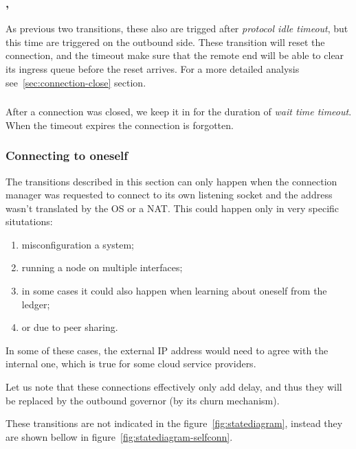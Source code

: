 \subsubsection{\CommitUniLoc{}, \CommitDupLoc{}}\label{sec:tr_commit_loc}
As previous two transitions, these also are trigged after \textit{protocol idle
timeout}, but this time are triggered on the outbound side.  These transition
will reset the connection, and the timeout make sure that the remote end will
be able to clear its ingress queue before the \TCP{} reset arrives.  For a more
detailed analysis see~\ref{sec:connection-close} section.


\subsubsection{\Terminate{}}
After a connection was closed, we keep it in \TerminatingState{} for the
duration of \textit{wait time timeout}.  When the timeout expires the
connection is forgotten.  

\subsubsection{Connecting to oneself}
The transitions described in this section can only happen when the connection
manager was requested to connect to its own listening socket and the address
wasn't translated by the \textsf{OS} or a \textsf{NAT}.  This could happen only
in very specific situtations:

\begin{enumerate}
  \item misconfiguration a system;
  \item running a node on multiple interfaces;
  \item in some cases it could also happen when learning about oneself from the
    ledger;
  \item or due to peer sharing.
\end{enumerate}

In some of these cases, the external IP address would need to agree with the
internal one, which is true for some cloud service providers.

Let us note that these connections effectively only add delay, and thus they
will be replaced by the outbound governor (by its churn mechanism).

These transitions are not indicated in the figure~\ref{fig:statediagram},
instead they are shown bellow in figure~\ref{fig:statediagram-selfconn}.

